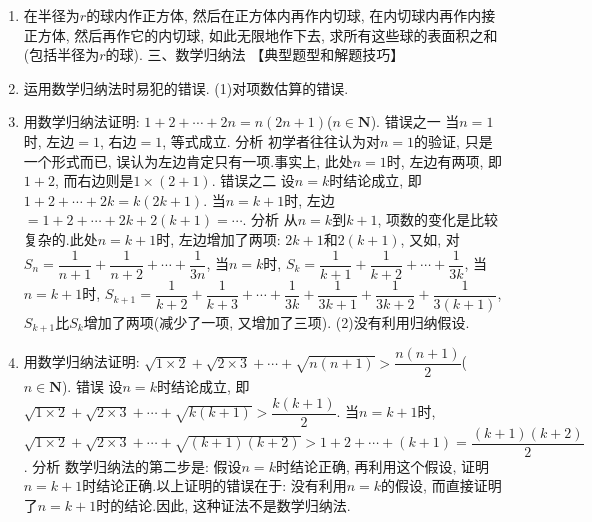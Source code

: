 \documentclass[10pt,a4paper]{article}
\begin{document}
\begin{enumerate}[1.]
\begin{center}
\end{center}
\item 在半径为$r$的球内作正方体, 然后在正方体内再作内切球, 在内切球内再作内接正方体, 然后再作它的内切球, 如此无限地作下去, 求所有这些球的表面积之和(包括半径为$r$的球).
三、数学归纳法
【典型题型和解题技巧】
\item 运用数学归纳法时易犯的错误.
(1)对项数估算的错误.
\item 用数学归纳法证明: $1+2+\cdots +2n=n(2n+1)$($n\in \mathbf{N}$).
错误之一  当$n=1$时, 左边$=1$, 右边$=1$, 等式成立.
分析  初学者往往认为对$n=1$的验证, 只是一个形式而已, 误认为左边肯定只有一项.事实上, 此处$n=1$时, 左边有两项, 即$1+2$, 而右边则是$1\times (2+1)$.
错误之二  设$n=k$时结论成立, 即$1+2+\cdots +2k=k(2k+1)$.
当$n=k+1$时, 左边$=1+2+\cdots +2k+2(k+1)=\cdots$.
分析  从$n=k$到$k+1$, 项数的变化是比较复杂的.此处$n=k+1$时, 左边增加了两项: $2k+1$和$2(k+1)$, 又如, 对$S_n=\dfrac 1{n+1}+\dfrac 1{n+2}+\cdots +\dfrac 1{3n}$,
当$n=k$时, $S_k=\dfrac 1{k+1}+\dfrac 1{k+2}+\cdots +\dfrac 1{3k}$,
当$n=k+1$时, $S_{k+1}=\dfrac 1{k+2}+\dfrac 1{k+3}+\cdots +\dfrac 1{3k}+\dfrac 1{3k+1}+\dfrac 1{3k+2}+\dfrac 1{3(k+1)}$,
$S_{k+1}$比$S_k$增加了两项(减少了一项, 又增加了三项).
(2)没有利用归纳假设.
\item 用数学归纳法证明: $\sqrt {1\times 2}+\sqrt {2\times 3}+\cdots +\sqrt {n(n+1)}>\dfrac{n(n+1)}2$($n\in \mathbf{N}$).
错误  设$n=k$时结论成立, 即$\sqrt {1\times 2}+\sqrt {2\times 3}+\cdots +\sqrt {k(k+1)}>\dfrac{k(k+1)}2$.
当$n=k+1$时,
$\sqrt {1\times 2}+\sqrt {2\times 3}+\cdots +\sqrt {(k+1)(k+2)}>1+2+\cdots +(k+1)=\dfrac{(k+1)(k+2)}2$.
分析  数学归纳法的第二步是: 假设$n=k$时结论正确, 再利用这个假设, 证明$n=k+1$时结论正确.以上证明的错误在于: 没有利用$n=k$的假设, 而直接证明了$n=k+1$时的结论.因此, 这种证法不是数学归纳法.

\end{enumerate}
\end{document}
